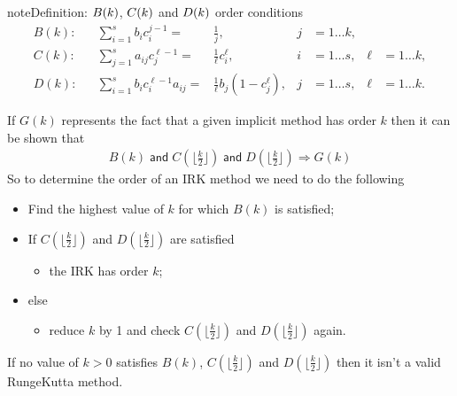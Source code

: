 \documentclass[letterpaper,10pt,english]{jupyterBook}
\begin{document}
\begin{sphinxadmonition}{note}{Definition: \protect\(B(k)\protect\), \protect\(C(k)\protect\) and \protect\(D(k)\protect\) order conditions }
\begin{align*}
  B(k): && \sum_{i=1}^s b_i c_i^{j-1} = & \frac{1}{j}, & j&=1\ldots k, \\
  C(k): && \sum_{j=1}^s a_{ij} c_j^{\ell-1} = & \frac{1}{\ell}c_i^{\ell} , & i&=1 \ldots s, & \ell &=1 \ldots k,\\
  D(k): && \sum_{i=1}^s b_i c_i^{\ell-1} a_{ij} = & \frac{1}{\ell}b_j (1-c_j^{\ell}), & j&=1 \ldots s, & \ell &=1 \ldots k.
\end{align*}\end{sphinxadmonition}

\sphinxAtStartPar
If \(G(k)\) represents the fact that a given implicit method has order \(k\) then it can be shown that
\begin{equation*}
\begin{split}B(k)\; \mathsf{and} \; C(\lfloor \frac{k}{2} \rfloor ) \; \mathsf{and} \; D(\lfloor \frac{k}{2} \rfloor ) \Longrightarrow G(k)\end{split}
\end{equation*}
\sphinxAtStartPar
So to determine the order of an IRK method we need to do the following
\begin{itemize}
\item {} 
\sphinxAtStartPar
Find the highest value of \(k\) for which \(B(k)\) is satisfied;

\item {} 
\sphinxAtStartPar
If \(C(\lfloor \frac{k}{2} \rfloor)\) and \(D(\lfloor \frac{k}{2} \rfloor)\) are satisfied
\begin{itemize}
\item {} 
\sphinxAtStartPar
the IRK has order \(k\);

\end{itemize}

\item {} 
\sphinxAtStartPar
else
\begin{itemize}
\item {} 
\sphinxAtStartPar
reduce \(k\) by 1 and check \(C(\lfloor \frac{k}{2} \rfloor)\) and \(D(\lfloor \frac{k}{2} \rfloor)\) again.

\end{itemize}

\end{itemize}

\sphinxAtStartPar
If no value of \(k>0\) satisfies \(B(k)\), \(C(\lfloor \frac{k}{2} \rfloor)\) and \(D(\lfloor \frac{k}{2} \rfloor)\) then it isn’t a valid Runge\sphinxhyphen{}Kutta method.
\end{document}
